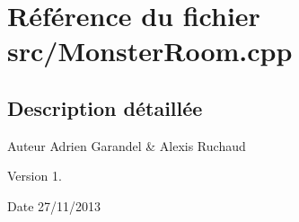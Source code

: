 \section{Référence du fichier src/\-Monster\-Room.cpp}
\label{_monster_room_8cpp}


\subsection{Description détaillée}
\begin{DoxyAuthor}{Auteur}
Adrien Garandel \& Alexis Ruchaud 
\end{DoxyAuthor}
\begin{DoxyVersion}{Version}
1. 
\end{DoxyVersion}
\begin{DoxyDate}{Date}
27/11/2013 
\end{DoxyDate}
